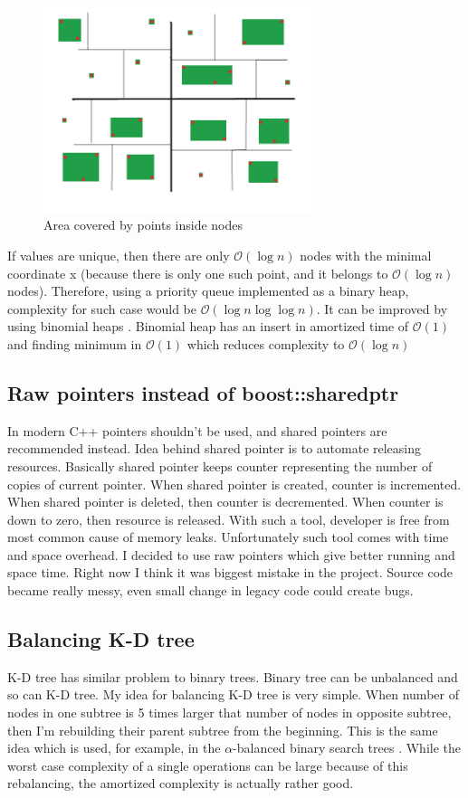 \documentclass[10pt,a4paper]{article}
\newcommand{\Oh}{\mathcal{O}}
\begin{document}
\begin{figure}
\centering
  \includegraphics[width=8cm]{simple_boundary2.png}%
  \caption{Area covered by points inside nodes}
  \label{fig:inside}
\end{figure}

If values are unique, then there are only $\Oh(\log n)$ nodes with the minimal coordinate x (because there is only one such point, and it belongs to $\Oh(\log n)$ nodes). Therefore, using a priority queue implemented as a binary heap, complexity for such case would be $\Oh(\log n \log \log n)$. It can be improved by using binomial heaps \cite{BINOMHEAPS} . Binomial heap has an insert in amortized time of $\Oh(1)$ and finding minimum in $\Oh(1)$ which reduces complexity to $\Oh(\log n)$

\subsection{Raw pointers instead of boost::shared\textunderscore ptr}

In modern C++ pointers shouldn't be used, and shared pointers are recommended instead. Idea behind shared pointer is to automate releasing resources. Basically shared pointer keeps counter representing the number of copies of current pointer. When shared pointer is created, counter is incremented. When shared pointer is deleted, then counter is decremented. When counter is down to zero, then resource is released. With such a tool, developer is free from most common cause of memory leaks. Unfortunately such tool comes with time and space overhead. I decided to use raw pointers which give better running and space time.
Right now I think it was biggest mistake in the project. Source code became really messy, even small change in legacy code could create bugs.

\subsection{Balancing K-D tree}
K-D tree has similar problem to binary trees. Binary tree can be unbalanced and so can K-D tree. My idea for balancing K-D tree is very simple. When number of nodes in one subtree is 5 times larger that number of nodes in opposite subtree, then I'm rebuilding their parent subtree from the beginning.
This is the same idea which is used, for example, in the $\alpha$-balanced binary search trees \cite{ALPHATREES}. While the worst case complexity of a single operations can be large because of this rebalancing, the amortized complexity \cite{AMOR} is actually rather good.
\end{document}
